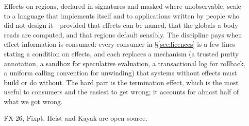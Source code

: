 \documentclass[acmsmall,screen,review]{acmart}
\newcommand{\fx}{FX-26}
\begin{document}
Effects on regions, declared in signatures and masked where
unobservable, scale to a language that implements itself and to
applications written by people who did not design it---provided that
effects can be named, that the globals a body reads are computed, and
that regions default sensibly. The discipline pays when effect
information is consumed: every consumer in \S\ref{sec:licences} is a
few lines stating a condition on effects, and each replaces a
mechanism (a trusted purity annotation, a sandbox for speculative
evaluation, a transactional log for rollback, a uniform calling
convention for unwinding) that systems without effects must build or
do without. The hard part is the termination effect, which is the
most useful to consumers and the easiest to get wrong; it accounts for
almost half of what we got wrong.

\fx, Fixpt, Heist and Kayak are open source.



\end{document}
